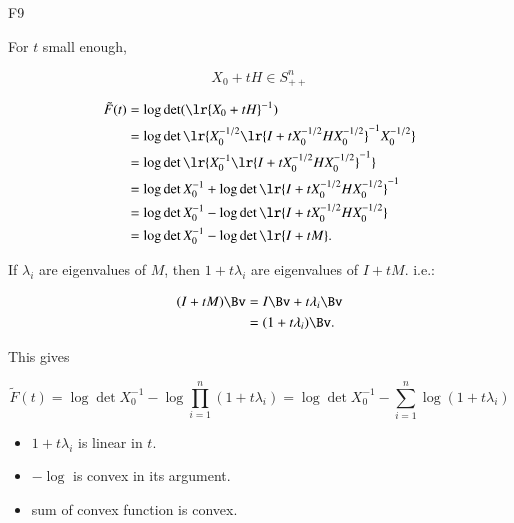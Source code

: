 F9

For \( t \) small enough,

\begin{equation}\label{eqn:convexOptimizationLecture8:400}
X_0 + t H \in S^n_{++}
\end{equation}

\begin{equation}\label{eqn:convexOptimizationLecture8:420}
\begin{aligned}
\tilde{F}(t)
&= \log \det( \lr{X_0 + t H}^{-1} ) \\
&= \log \det\lr{ X_0^{-1/2} \lr{I + t X_0^{-1/2} H X_0^{-1/2} }^{-1} X_0^{-1/2} } \\
&= \log \det\lr{ X_0^{-1} \lr{I + t X_0^{-1/2} H X_0^{-1/2} }^{-1} } \\
&= \log \det X_0^{-1} + \log\det \lr{I + t X_0^{-1/2} H X_0^{-1/2} }^{-1} \\
&= \log \det X_0^{-1} - \log\det \lr{I + t X_0^{-1/2} H X_0^{-1/2} } \\
&= \log \det X_0^{-1} - \log\det \lr{I + t M }.
\end{aligned}
\end{equation}

If \( \lambda_i \) are eigenvalues of \( M \), then \( 1 + t \lambda_i \) are eigenvalues of \( I + t M \).  i.e.:

\begin{equation}\label{eqn:convexOptimizationLecture8:440}
\begin{aligned}
(I + t M) \Bv
&= I \Bv + t \lambda_i \Bv \\
&= (1 + t \lambda_i) \Bv.
\end{aligned}
\end{equation}

This gives

\begin{equation}\label{eqn:convexOptimizationLecture8:460}
\tilde{F}(t)
= \log \det X_0^{-1} - \log \prod_{i = 1}^n (1 + t \lambda_i)
= \log \det X_0^{-1} - \sum_{i = 1}^n \log (1 + t \lambda_i)
\end{equation}

\begin{itemize}
\item \( 1 + t \lambda_i \) is linear in \( t \).
\item \( -\log \) is convex in its argument.
\item sum of convex function is convex.
\end{itemize}

